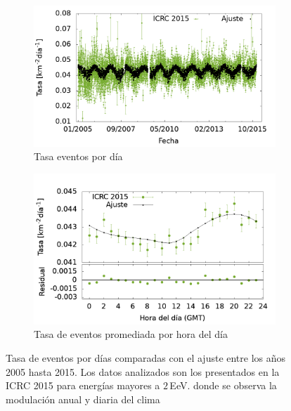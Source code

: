 			\begin{figure}[H]
				\begin{subfigure}[b]{0.5\textwidth}
				\includegraphics[width=\textwidth]{Graphs/rate_dayly/2EeV_ICRC_2015.png}
				\caption{Tasa eventos por día}\label{fig:rate_dayly_ICRC_2015_2EeV}
    			\end{subfigure}%
    			\hspace{\fill}
    			\begin{subfigure}[b]{0.5\textwidth}
				\includegraphics[width=\textwidth]{Graphs/rate_hour_of_the_day/2EeV_ICRC_2015_old_herald.png}
				\caption{Tasa de eventos promediada por hora del día }\label{fig:rate_hod_ICRC_2015_2EeV}
    			\end{subfigure}%
				\caption{Tasa de eventos por días comparadas con el ajuste entre los años 2005 hasta 2015. Los datos analizados son los presentados en la ICRC 2015 para energías mayores a $2\,$EeV. donde se observa la modulación anual y diaria del clima }\label{fig:rate_2015_05-15_2EeV}
			\end{figure}


